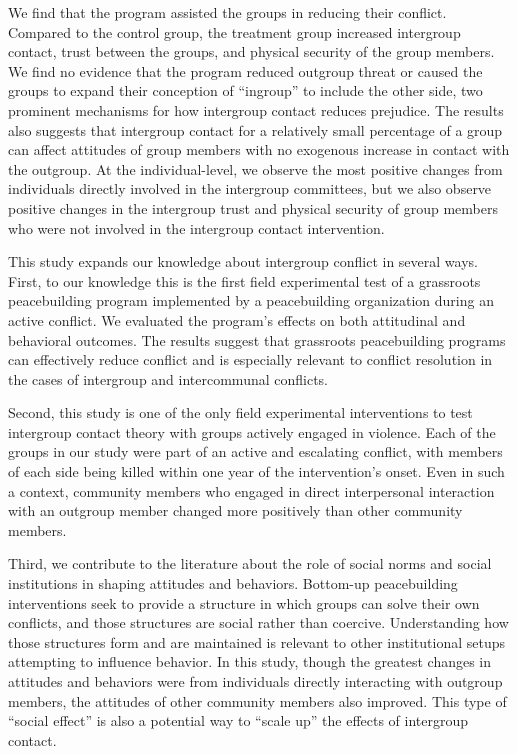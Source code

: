 \documentclass[11pt]{article}
\begin{document}
We find that the program assisted the groups in reducing their conflict.
Compared to the control group, the treatment group increased intergroup
contact, trust between the groups, and physical security of the group
members. We find no evidence that the program reduced outgroup threat or
caused the groups to expand their conception of ``ingroup'' to include
the other side, two prominent mechanisms for how intergroup contact
reduces prejudice. The results also suggests that intergroup contact for
a relatively small percentage of a group can affect attitudes of group
members with no exogenous increase in contact with the outgroup. At the
individual-level, we observe the most positive changes from individuals
directly involved in the intergroup committees, but we also observe
positive changes in the intergroup trust and physical security of group
members who were not involved in the intergroup contact intervention.

This study expands our knowledge about intergroup conflict in several
ways. First, to our knowledge this is the first field experimental test
of a grassroots peacebuilding program implemented by a peacebuilding
organization during an active conflict. We evaluated the program's
effects on both attitudinal and behavioral outcomes. The results suggest
that grassroots peacebuilding programs can effectively reduce conflict
and is especially relevant to conflict resolution in the cases of
intergroup and intercommunal conflicts.

Second, this study is one of the only field experimental interventions
to test intergroup contact theory with groups actively engaged in
violence. Each of the groups in our study were part of an active and
escalating conflict, with members of each side being killed within one
year of the intervention's onset. Even in such a context, community
members who engaged in direct interpersonal interaction with an outgroup
member changed more positively than other community members.

Third, we contribute to the literature about the role of social norms
and social institutions in shaping attitudes and behaviors. Bottom-up
peacebuilding interventions seek to provide a structure in which groups
can solve their own conflicts, and those structures are social rather
than coercive. Understanding how those structures form and are
maintained is relevant to other institutional setups attempting to
influence behavior. In this study, though the greatest changes in
attitudes and behaviors were from individuals directly interacting with
outgroup members, the attitudes of other community members also
improved. This type of ``social effect'' is also a potential way to
``scale up'' the effects of intergroup contact.
\end{document}
